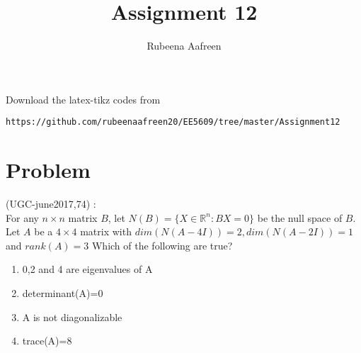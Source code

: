 \documentclass[journal,12pt]{IEEEtran}
\begin{document}
     \def\rightbox#1{\makebox[0in][r]{#1}}
     \def\centbox#1{\makebox[0in]{#1}}
     \def\topbox#1{\raisebox{-\baselineskip}[0in][0in]{#1}}
     \def\midbox#1{\raisebox{-0.5\baselineskip}[0in][0in]{#1}}
\vspace{3cm}
\title{Assignment 12}
\author{Rubeena Aafreen}
\maketitle
\bigskip
\renewcommand{\thefigure}{\theenumi}
\renewcommand{\thetable}{\theenumi}
%
Download the latex-tikz codes from 
%
\begin{lstlisting}
https://github.com/rubeenaafreen20/EE5609/tree/master/Assignment12
\end{lstlisting}
\section{\textbf{Problem}}
(UGC-june2017,74) : \\
%
For any $n\times n$ matrix $B$, let $N(B)=\{X\in \mathbb{R}^n:BX=0\}$ be the null space of $B$. Let $A$ be a $4\times 4$ matrix with $dim(N(A-4I))=2, dim(N(A-2I))=1$ and $rank(A)=3$
Which of the following are true?\\
\begin{enumerate}
\item 0,2 and 4 are eigenvalues of A
\item determinant(A)=0
\item A is not diagonalizable
\item trace(A)=8
\end{enumerate}
\end{document}
